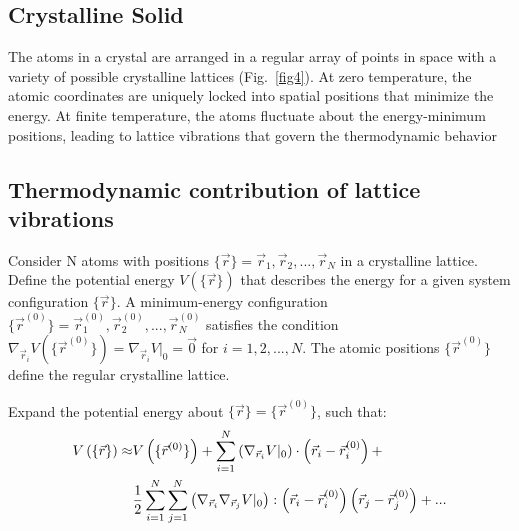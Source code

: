 \documentclass[book.tex]{subfiles}
\begin{document}
\subsection{Crystalline Solid}


The atoms in a crystal are arranged in a regular array of points in space with a variety of possible crystalline lattices (Fig.~\ref{fig4}). At zero temperature, the atomic coordinates are uniquely locked into spatial positions that minimize the energy. At finite temperature, the atoms fluctuate about the energy-minimum positions, leading to lattice vibrations that govern the thermodynamic behavior %


\subsection{Thermodynamic contribution of lattice vibrations}

Consider N atoms with positions $\{\vec{r}\} = \vec{r}_1, \vec{r}_2,...,\vec{r}_N$ in a crystalline lattice. Define the potential energy $V\left(\{\vec{r}\}\right)$ that describes the energy for a given system configuration  $\{\vec{r}\}$. A minimum-energy configuration $\{\vec{r}^{(0)}\} = \vec{r}^{(0)}_1, \vec{r}^{(0)}_2,...,\vec{r}^{(0)}_N$ satisfies the condition $\nabla_{\vec{r}_i} V\left(\{\vec{r}^{(0)}\}\right) = \nabla_{\vec{r}_i} V|_0 = \vec{0}$ for $i = 1,2,...,N$. The atomic positions $\{\vec{r}^{(0)}\}$ define the regular crystalline lattice.

Expand the potential energy about $\{\vec{r}\} = \{\vec{r}^{(0)}\}$, such that:
\begin{align}
V\left(\{\vec{r}\}\right) \approx  &V\left(\{\vec{r}^{(0)}\}\right) + \sum_{i=1}^N \left(\nabla_{\vec{r}_i} V|_0\right)\cdot \left(\vec{r}_i - \vec{r}^{(0)}_i \right) + \notag\\ &\frac{1}{2} \sum_{i=1}^N \sum_{j=1}^N \left(\nabla_{\vec{r}_i} \nabla_{\vec{r}_j} V|_0\right): \left(\vec{r}_i - \vec{r}^{(0)}_i \right) \left(\vec{r}_j - \vec{r}^{(0)}_j \right) + ... \notag
\end{align}
\end{document}
